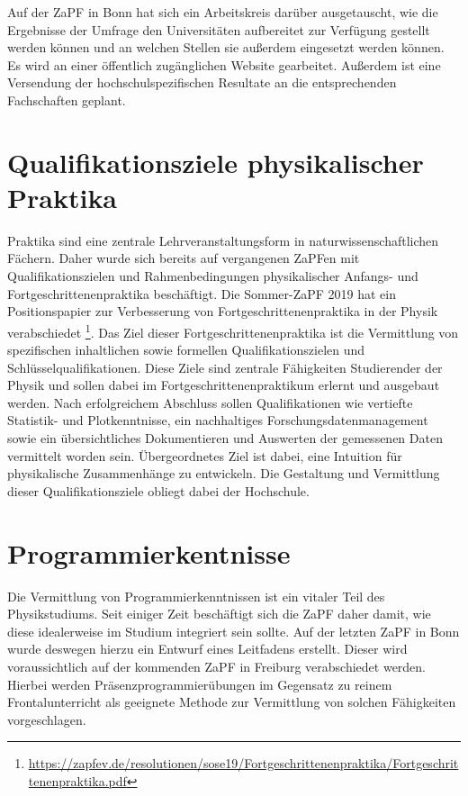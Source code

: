 Auf der ZaPF in Bonn hat sich ein Arbeitskreis darüber ausgetauscht, wie die Ergebnisse der Umfrage den Universitäten aufbereitet zur Verfügung gestellt werden können und an welchen Stellen sie außerdem eingesetzt werden können.
Es wird an einer öffentlich zugänglichen Website gearbeitet.
Außerdem ist eine Versendung der hochschulspezifischen Resultate an die entsprechenden Fachschaften geplant.

\section*{Qualifikationsziele physikalischer Praktika}

Praktika sind eine zentrale Lehrveranstaltungsform in naturwissenschaftlichen Fächern. Daher wurde sich bereits auf vergangenen ZaPFen mit 
Qualifikationszielen und Rahmenbedingungen physikalischer Anfangs- und Fortgeschrittenenpraktika beschäftigt. 
Die Sommer-ZaPF 2019 hat ein Positionspapier zur Verbesserung von Fortgeschrittenenpraktika in der Physik verabschiedet \footnote{\url{https://zapfev.de/resolutionen/sose19/Fortgeschrittenenpraktika/Fortgeschrittenenpraktika.pdf}}. 
Das Ziel dieser Fortgeschrittenenpraktika ist die Vermittlung von spezifischen inhaltlichen sowie formellen Qualifikationszielen und Schlüsselqualifikationen. 
Diese Ziele sind zentrale Fähigkeiten Studierender der Physik und sollen dabei im Fortgeschrittenenpraktikum erlernt und ausgebaut werden. 
Nach erfolgreichem Abschluss sollen Qualifikationen wie vertiefte Statistik- und Plotkenntnisse, ein nachhaltiges Forschungsdatenmanagement sowie ein übersichtliches Dokumentieren und Auswerten der gemessenen Daten vermittelt worden sein. 
Übergeordnetes Ziel ist dabei, eine Intuition für physikalische Zusammenhänge zu entwickeln.
Die Gestaltung und Vermittlung dieser Qualifikationsziele obliegt dabei der Hochschule. 

\section*{Programmierkentnisse}

Die Vermittlung von Programmierkenntnissen ist ein vitaler Teil des Physikstudiums. 
Seit einiger Zeit beschäftigt sich die ZaPF daher damit, wie diese idealerweise im Studium integriert sein sollte. 
Auf der letzten ZaPF in Bonn wurde deswegen hierzu ein Entwurf eines Leitfadens erstellt. Dieser wird voraussichtlich auf der kommenden ZaPF in Freiburg verabschiedet werden. 
Hierbei werden Präsenzprogrammierübungen im Gegensatz zu reinem Frontalunterricht als geeignete Methode zur Vermittlung von solchen Fähigkeiten vorgeschlagen.

